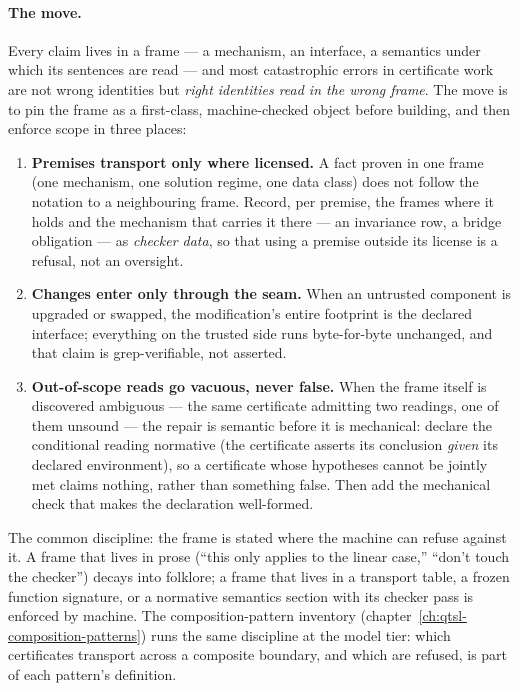 \paragraph{The move.} Every claim lives in a frame --- a mechanism, an
interface, a semantics under which its sentences are read --- and most
catastrophic errors in certificate work are not wrong identities but
\emph{right identities read in the wrong frame}. The move is to pin the
frame as a first-class, machine-checked object before building, and
then enforce scope in three places:

\begin{enumerate}
\item \textbf{Premises transport only where licensed.} A fact proven in
  one frame (one mechanism, one solution regime, one data class) does
  not follow the notation to a neighbouring frame. Record, per premise,
  the frames where it holds and the mechanism that carries it there ---
  an invariance row, a bridge obligation --- as \emph{checker data}, so
  that using a premise outside its license is a refusal, not an
  oversight.
\item \textbf{Changes enter only through the seam.} When an untrusted
  component is upgraded or swapped, the modification's entire footprint
  is the declared interface; everything on the trusted side runs
  byte-for-byte unchanged, and that claim is grep-verifiable, not
  asserted.
\item \textbf{Out-of-scope reads go vacuous, never false.} When the
  frame itself is discovered ambiguous --- the same certificate
  admitting two readings, one of them unsound --- the repair is
  semantic before it is mechanical: declare the conditional reading
  normative (the certificate asserts its conclusion \emph{given} its
  declared environment), so a certificate whose hypotheses cannot be
  jointly met claims nothing, rather than something false. Then add the
  mechanical check that makes the declaration well-formed.
\end{enumerate}

The common discipline: the frame is stated where the machine can refuse
against it. A frame that lives in prose (``this only applies to the
linear case,'' ``don't touch the checker'') decays into folklore; a
frame that lives in a transport table, a frozen function signature, or
a normative semantics section with its checker pass is enforced by
machine.
The composition-pattern inventory
(chapter~\ref{ch:qtsl-composition-patterns}) runs the same discipline
at the model tier: which certificates transport across a composite
boundary, and which are refused, is part of each pattern's definition.

